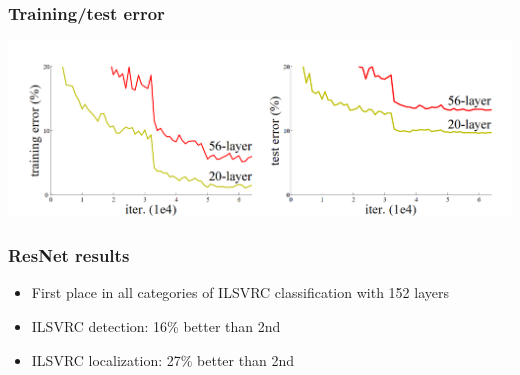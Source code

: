 \documentclass{beamer}
\begin{document}
\begin{frame}
    \frametitle{Training/test error}
\begin{center}
    \includegraphics[width=\textwidth]{figs/deeper-error.png}
\end{center}

\end{frame}

\begin{frame}
	\frametitle{ResNet results}
\begin{itemize}
	\item First place in all categories of ILSVRC classification with 152 layers
	\item ILSVRC detection: 16\% better than 2nd
	\item ILSVRC localization: 27\% better than 2nd
\end{itemize}
	

\end{frame}
\end{document}
